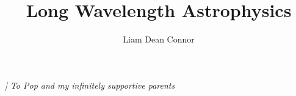 \documentclass[12pt]{ut-thesis}
\author{Liam Dean Connor}
\title{Long Wavelength Astrophysics}
\begin{document}
\begin{preliminary}

\maketitle



\begin{abstract} %

\end{abstract}



\vspace*{\fill}
\begin{center}
{\em| To Pop and my infinitely supportive parents}
\end{center}
\vfill

\newpage %




\end{preliminary}
\end{document}

